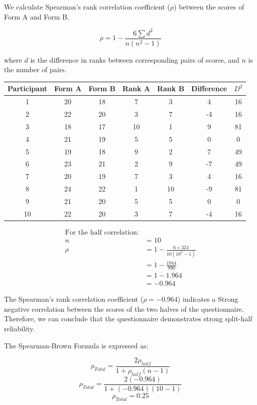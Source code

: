 \documentclass[12pt, a4paper]{exam}
\begin{document}
We calculate Spearman's rank correlation coefficient ($\rho$) between the scores of Form A and Form B.

\[
\rho = 1 - \frac{6 \sum d^2}{n(n^2 - 1)}
\]

where $d$ is the difference in ranks between corresponding pairs of scores, and $n$ is the number of pairs.


\begin{table}[htbp]
\centering
\begin{tabular}{@{}ccccccc@{}}
\toprule
Participant & Form A & Form B & Rank A & Rank B & Difference & $D^2$ \\ \midrule
1           & 20  & 18  & 7  & 3  & 4 & 16 \\
2           & 22  & 20  & 3  & 7  & -4 & 16  \\
3           & 18  & 17  & 10  & 1  & 9 & 81 \\
4           & 21  & 19  & 5  & 5  & 0 & 0  \\
5           & 19  & 18  & 9  & 2  & 7 & 49  \\
6           & 23  & 21  & 2  & 9  & -7 & 49  \\
7           & 20  & 19  & 7  & 3  & 4 & 16  \\
8           & 24  & 22  & 1  & 10  & -9 & 81 \\
9           & 21  & 20  & 5  & 5  & 0 & 0  \\
10           & 22  & 20  & 3  & 7  & -4 & 16 \\ \bottomrule
\end{tabular}
\end{table}

\begin{align*}
\text{For the half correlation:} & \\
n & = 10 \\
\rho & = 1 - \frac{6 \times 324}{10(10^2 - 1)} \\
& = 1 - \frac{1944}{990} \\
& = 1 - 1.964 \\
& = -0.964
\end{align*}


The Spearman's rank correlation coefficient ($\rho = -0.964$) indicates a Strong negative correlation between the scores of the two halves of the questionnaire. Therefore, we can conclude that the questionnaire demonstrates strong split-half reliability.

The Spearman-Brown Formula is expressed as:

\[
\rho_{Total} = \frac{2\rho_{half}}{1 + \rho_{half}(n - 1)} 
\]
\[
\rho_{Total} = \frac{2(-0.964) }{1 + (-0.964)(10 - 1)}
\]
\[
\rho_{Total} = 0.25
\]
\end{document}
